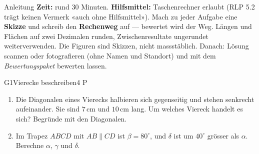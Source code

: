 \documentclass[11pt]{article}
\begin{document}

\begin{lpinfo}{Anleitung}
\textbf{Zeit:} rund 30 Minuten. \textbf{Hilfsmittel:} Taschenrechner erlaubt (RLP 5.2 trägt keinen Vermerk «auch ohne
Hilfsmittel»). Mach zu jeder Aufgabe eine \textbf{Skizze} und schreib den \textbf{Rechenweg} auf — bewertet wird der Weg.
Längen und Flächen auf zwei Dezimalen runden, Zwischenresultate ungerundet weiterverwenden. Die Figuren sind Skizzen,
nicht massstäblich. Danach: Lösung scannen oder fotografieren (ohne Namen und Standort) und mit dem
\emph{Bewertungspaket} bewerten lassen.
\end{lpinfo}


\begin{lpaufgabe}{G1}{Vierecke beschreiben}{4 P}
\begin{enumerate}[label=(\alph*),leftmargin=*,itemsep=2pt]
\item Die Diagonalen eines Vierecks halbieren sich gegenseitig und stehen senkrecht aufeinander. Sie sind $7\,\text{cm}$
  und $10\,\text{cm}$ lang. Um welches Viereck handelt es sich? Begründe mit den Diagonalen.
\item Im Trapez $ABCD$ mit $AB \parallel CD$ ist $\beta = 80^\circ$, und $\delta$ ist um $40^\circ$ grösser als $\alpha$.
  Berechne $\alpha$, $\gamma$ und $\delta$.
\end{enumerate}
\end{lpaufgabe}
\end{document}
